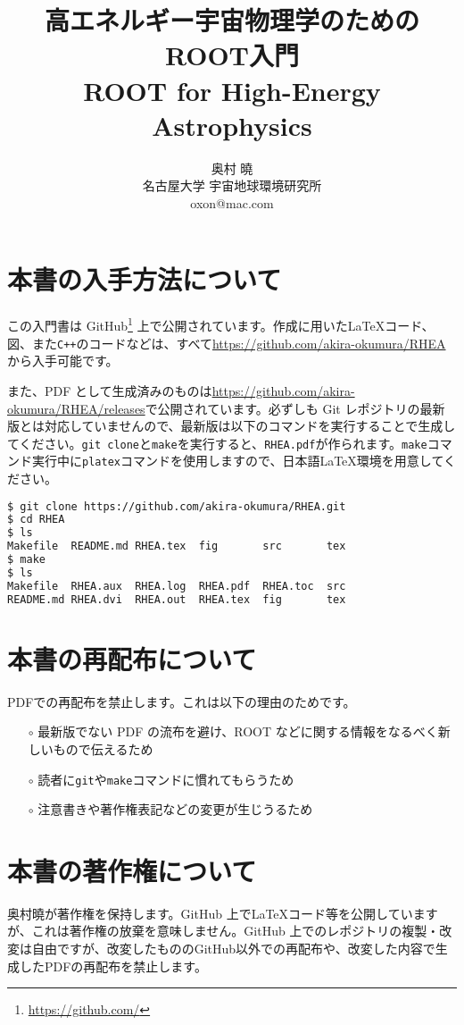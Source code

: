 \documentclass[oneside]{jsbook}
\title{{\huge 高エネルギー宇宙物理学のためのROOT入門\\ROOT for High-Energy Astrophysics}}
\author{{\Large 奥村 曉} \\ 名古屋大学 宇宙地球環境研究所 \\ oxon@mac.com}
\makeatletter
\def\@listoflistenv{[NoFloat][listings][lstlisting]}
\newif\if@expire@floats \@expire@floatsfalse
\def\begin#1{%
   \@ifundefined{#1}%
      {\def\reserved@a{\@latex@error{Environment #1 undefined}\@eha}}%
      {\def\reserved@a{\def\@currenvir{#1}%
          \edef\@currenvline{\on@line}%
          \@check@listenv
          \csname #1\endcsname}}%
       \@ignorefalse
   \begingroup\@endpefalse\reserved@a}
\def\@check@listenv{%
   \@expandtwoargs\in@{[\@currenvir]}{\@listoflistenv}%
   \ifin@ \@expire@floatstrue \fi}
\makeatother
\begin{document}
\maketitle
\frontmatter
\section*{本書の入手方法について}
この入門書は GitHub\footnote{\url{https://github.com/}} 上で公開されています。作成に用いた\LaTeX コード、図、また\texttt{C++}のコードなどは、すべて\url{https://github.com/akira-okumura/RHEA}から入手可能です。

また、PDF として生成済みのものは\url{https://github.com/akira-okumura/RHEA/releases}で公開されています。必ずしも Git レポジトリの最新版とは対応していませんので、最新版は以下のコマンドを実行することで生成してください。\texttt{git clone}と\texttt{make}を実行すると、\texttt{RHEA.pdf}が作られます。\texttt{make}コマンド実行中に\texttt{platex}コマンドを使用しますので、日本語\LaTeX 環境を用意してください。

\begin{lstlisting}[language=bash]
$ git clone https://github.com/akira-okumura/RHEA.git
$ cd RHEA
$ ls
Makefile  README.md RHEA.tex  fig       src       tex
$ make
$ ls
Makefile  RHEA.aux  RHEA.log  RHEA.pdf  RHEA.toc  src
README.md RHEA.dvi  RHEA.out  RHEA.tex  fig       tex
\end{lstlisting}

\section*{本書の再配布について}
PDFでの再配布を禁止します。これは以下の理由のためです。
\begin{itemize}
\item[$\circ$]最新版でない PDF の流布を避け、ROOT などに関する情報をなるべく新しいもので伝えるため
\item[$\circ$]読者に\texttt{git}や\texttt{make}コマンドに慣れてもらうため
\item[$\circ$]注意書きや著作権表記などの変更が生じうるため
\end{itemize}

\section*{本書の著作権について}
奥村曉が著作権を保持します。GitHub 上で\LaTeX コード等を公開していますが、これは著作権の放棄を意味しません。GitHub 上でのレポジトリの複製・改変は自由ですが、改変したもののGitHub以外での再配布や、改変した内容で生成したPDFの再配布を禁止します。
\end{document}
